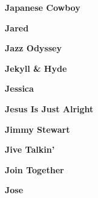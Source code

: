 \vspace{10pt} 
\begin{center}\textbf{Japanese Cowboy}\end{center}
\newline
\vspace{10pt} 
\begin{center}\textbf{Jared}\end{center}
\newline
\vspace{10pt} 
\begin{center}\textbf{Jazz Odyssey}\end{center}
\newline
\vspace{10pt} 
\begin{center}\textbf{Jekyll \& Hyde}\end{center}
\newline
\vspace{10pt} 
\begin{center}\textbf{Jessica}\end{center}
\newline
\vspace{10pt} 
\begin{center}\textbf{Jesus Is Just Alright}\end{center}
\newline
\vspace{10pt} 
\begin{center}\textbf{Jimmy Stewart}\end{center}
\newline
\vspace{10pt} 
\begin{center}\textbf{Jive Talkin'}\end{center}
\newline
\vspace{10pt} 
\begin{center}\textbf{Join Together}\end{center}
\newline
\vspace{10pt} 
\begin{center}\textbf{Jose}\end{center}

